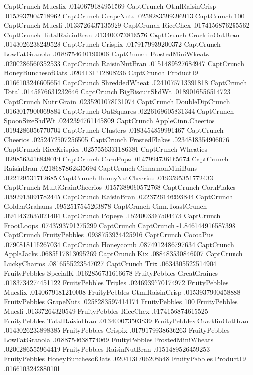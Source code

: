 CaptCrunch	Mueslix	.0140679184951569
CaptCrunch	OtmlRaisinCrisp	.0153937904718962
CaptCrunch	GrapeNuts	.0258283599396913
CaptCrunch	100%
CaptCrunch	Muesli	.0133726437135929
CaptCrunch	RiceChex	.0174156876265562
CaptCrunch	TotalRaisinBran	.013400073818576
CaptCrunch	CracklinOatBran	.0143026238249528
CaptCrunch	Crispix	.0179179939200372
CaptCrunch	LowFatGranola	.0188754640190006
CaptCrunch	FrostedMiniWheats	.0200286560352533
CaptCrunch	RaisinNutBran	.0151489527684947
CaptCrunch	HoneyBunchesofOats	.0204131712808236
CaptCrunch	Product19	.0166103246605654
CaptCrunch	ShreddedWheat	.0241075713391818
CaptCrunch	Total	.0145876631232646
CaptCrunch	BigBiscuitShdWt	.0189016556514723
CaptCrunch	NutriGrain	.0235201078031074
CaptCrunch	DoubleDipCrunch	.0163017900069884
CaptCrunch	OatSquares	.0226169605831344
CaptCrunch	SpoonSizeShdWt	.0242394761145809
CaptCrunch	AppleCinn.Cheerios	.0194286056770704
CaptCrunch	Clusters	.0183454859991467
CaptCrunch	Cheerios	.0252472607256505
CaptCrunch	FrostedFlakes	.0234818354906076
CaptCrunch	RiceKrispies	.0257556331186381
CaptCrunch	Wheaties	.0298563416848019
CaptCrunch	CornPops	.0147994736165674
CaptCrunch	RaisinBran	.0218687862435694
CaptCrunch	CinnamonMiniBuns	.022129531712685
CaptCrunch	HoneyNutCheerios	.0193595351772433
CaptCrunch	MultiGrainCheerios	.0157389090572768
CaptCrunch	CornFlakes	.0392913091782445
CaptCrunch	RaisinBran	.0223726146993844
CaptCrunch	GoldenGrahams	.0952517545203878
CaptCrunch	Cinn.ToastCrunch	.0941432637021404
CaptCrunch	Popeye	.1524003387504473
CaptCrunch	FrootLoops	.0743793791275299
CaptCrunch	CaptCrunch	-1.846144916587398
CaptCrunch	FruityPebbles	.0938753924425916
CaptCrunch	CocoaPus	.0790818115267034
CaptCrunch	Honeycomb	.0874912486797634
CaptCrunch	AppleJacks	.0685517813095269
CaptCrunch	Kix	.088483530846007
CaptCrunch	LuckyCharms	.0816555223547027
CaptCrunch	Trix	.0634305522514904
FruityPebbles	SpecialK	.0162856731616678
FruityPebbles	GreatGraines	.0183734274451122
FruityPebbles	Triples	.0246939770174972
FruityPebbles	Mueslix	.0140679181210008
FruityPebbles	OtmlRaisinCrisp	.0153937900458888
FruityPebbles	GrapeNuts	.0258283597414174
FruityPebbles	100%
FruityPebbles	Muesli	.01337264320549
FruityPebbles	RiceChex	.0174156874615525
FruityPebbles	TotalRaisinBran	.013400073503839
FruityPebbles	CracklinOatBran	.0143026233898385
FruityPebbles	Crispix	.0179179938636263
FruityPebbles	LowFatGranola	.0188754638774069
FruityPebbles	FrostedMiniWheats	.0200286555964419
FruityPebbles	RaisinNutBran	.0151489526459253
FruityPebbles	HoneyBunchesofOats	.0204131706208548
FruityPebbles	Product19	.0166103242880101
